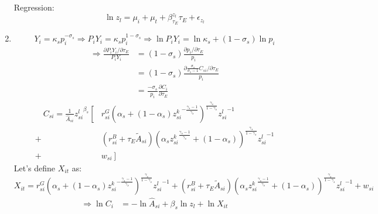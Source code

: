 \documentclass[12pt]{article} %
\begin{document}
\begin{enumerate}
    Regression:
    \begin{equation*}
        \ln z_l = \mu_i + \mu_t + \beta_{\tau_E}^{z_l} \tau_E + \epsilon_{z_l}
    \end{equation*}
    \item 
    \begin{equation*}
        Y_i = \kappa_s p_i^{-\sigma_s} \Rightarrow P_iY_i = \kappa_s p_i^{1-\sigma_s} \Rightarrow \ln P_iY_i = \ln \kappa_s + (1-\sigma_s) \ln p_i
    \end{equation*}
    \begin{equation*}
        \begin{split}
            \Rightarrow  \frac{\partial P_iY_i/\partial\tau_E}{P_iY_i} & = (1-\sigma_s) \frac{\partial p_i/\partial\tau_E}{p_i} \\
             &  = (1-\sigma_s) \frac{\partial \frac{\sigma_s}{\sigma_s - 1} C_{si}/\partial\tau_E}{p_i}\\
                & =  \frac{- \sigma_s}{p_i} \frac{\partial C_i}{\partial\tau_E} 
        \end{split}
    \end{equation*}
    \begin{equation*}
        \begin{split}
           \quad C_{si}  =  \frac{1}{\hat{A}_{si}} {z_{si}^l}^{\beta_s}  \left[\right. &
        r^{G}_{si}( \alpha_s  + (1-\alpha_s){z^k_{si}}^{-\frac{\gamma_s-1}{\gamma_s}})
           ^{\frac{\gamma_s}{1-\gamma_s}} {z_{si}^l}^{-1} \\
           + & (r^{B}_{si} + \tau_{E}\tilde{A}_{si})(
               \alpha_s {z^k_{si}}^{\frac{\gamma_s -1}{\gamma_s}} + (1-\alpha_s)
           )^{\frac{\gamma_s}{1-\gamma_s}} {z_{si}^l}^{-1}\\
           + & w_{si} \left.\right]
        \end{split}
   \end{equation*}
    Let's define $X_{it}$ as:
    \begin{equation*}
        X_{it} =  r^{G}_{si}( \alpha_s  + (1-\alpha_s){z^k_{si}}^{-\frac{\gamma_s-1}{\gamma_s}})
        ^{\frac{\gamma_s}{1-\gamma_s}} {z_{si}^l}^{-1} + (r^{B}_{si} + \tau_{E}\tilde{A}_{si})(
            \alpha_s {z^k_{si}}^{\frac{\gamma_s -1}{\gamma_s}} + (1-\alpha_s)
        )^{\frac{\gamma_s}{1-\gamma_s}} {z_{si}^l}^{-1} + w_{si} 
    \end{equation*}
    \begin{equation*}
        \begin{split}
            \Rightarrow \ln C_i & =  -\ln \hat{A}_{si} + \beta_s \ln z_l +  \ln X_{it} \\

\end{split}
\end{equation*}
\end{enumerate}
\end{document}
